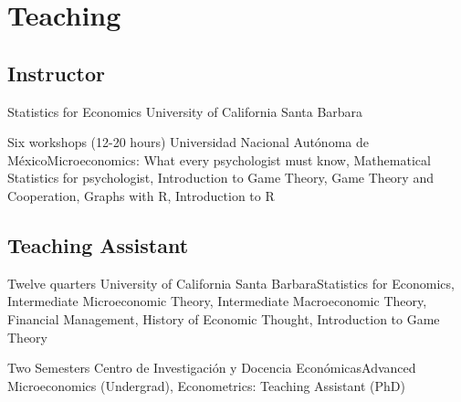\section{Teaching}

\subsection{Instructor}

{Statistics for Economics}
{University of California Santa Barbara}{}{}{}

{Six workshops (12-20 hours)}
{Universidad Nacional Autónoma de México}{}{}{Microeconomics: What every psychologist must know, Mathematical Statistics for psychologist, Introduction to Game Theory, Game Theory and Cooperation, Graphs with R, Introduction to R}


\subsection{Teaching Assistant}

{Twelve quarters}
{University of California Santa Barbara}{}{}{Statistics for Economics, Intermediate Microeconomic Theory, Intermediate Macroeconomic Theory, Financial Management, History of Economic Thought, Introduction to Game Theory}

{Two Semesters}
{Centro de Investigación y Docencia Económicas}{}{}{Advanced Microeconomics (Undergrad), Econometrics: Teaching Assistant (PhD)}
